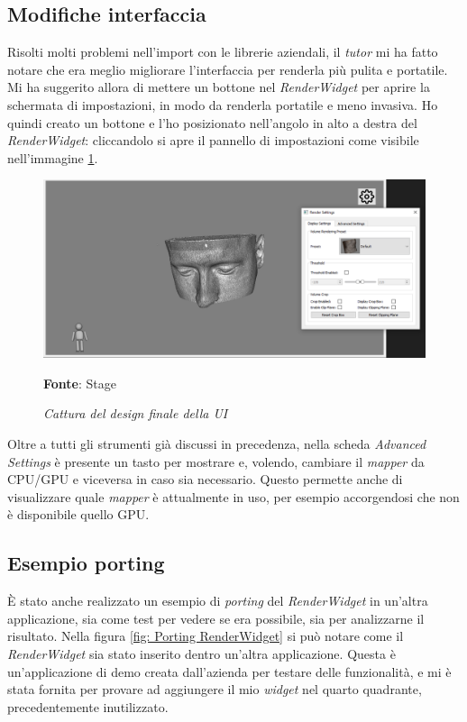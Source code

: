 \subsection{Modifiche interfaccia}
Risolti molti problemi nell'import con le librerie aziendali, il \emph{tutor} mi ha fatto notare che era meglio migliorare l'interfaccia per renderla più pulita e portatile. Mi ha suggerito allora di mettere un bottone nel \emph{RenderWidget} per aprire la schermata di impostazioni, in modo da renderla portatile e meno invasiva. Ho quindi creato un bottone e l'ho posizionato nell'angolo in alto a destra del \emph{RenderWidget}: cliccandolo si apre il pannello di impostazioni come visibile nell'immagine \ref{fig: Final UI}.

\begin{figure}[h]
    \centering
    \includegraphics[width=1\textwidth]{immagini/svolgimento/finalnewui.png}
    \caption{\textit{Cattura del design finale della UI}}
    \textbf{Fonte}: Stage
    \label{fig: Final UI}
\end{figure}

Oltre a tutti gli strumenti già discussi in precedenza, nella scheda \emph{Advanced Settings} è presente un tasto per mostrare e, volendo, cambiare il \emph{mapper} da CPU/GPU e viceversa in caso sia necessario. Questo permette anche di visualizzare quale \emph{mapper} è attualmente in uso, per esempio accorgendosi che non è disponibile quello GPU.

\subsection{Esempio porting}
\`E stato anche realizzato un esempio di \emph{porting} del \emph{RenderWidget} in un'altra applicazione, sia come test per vedere se era possibile, sia per analizzarne il risultato. Nella figura \ref{fig: Porting RenderWidget} si può notare come il \emph{RenderWidget} sia stato inserito dentro un'altra applicazione. Questa è un'applicazione di demo creata dall'azienda per testare delle funzionalità, e mi è stata fornita per provare ad aggiungere il mio \emph{widget} nel quarto quadrante, precedentemente inutilizzato.

